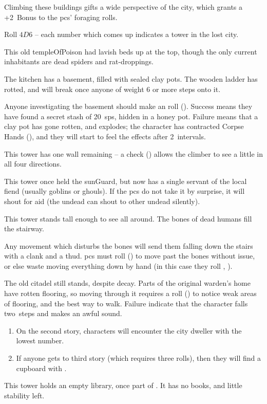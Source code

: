 \begin{multicols}{2}
Climbing these buildings gifts a wide perspective of the city, which grants a +2~Bonus to the \glspl{pc}' foraging rolls.

Roll $4D6$ -- each number which comes up indicates a tower in the lost city.

\begin{dlist}
  \item
  This old \gls{templeOfPoison} had lavish beds up at the top, though the only current inhabitants are dead spiders and rat-droppings.

  The kitchen has a basement, filled with sealed clay pots.
  The wooden ladder has rotted, and will break once anyone of \gls{weight} 6 or more steps onto it.

  Anyone investigating the basement should make an  roll (\tn[10]).
  Success means they have found a secret stash of 20~\glspl{sp}, hidden in a honey pot.
  Failure means that a clay pot has gone rotten, and explodes; the character has contracted Corpse Hands (), and they will start to feel the effects after 2~\glspl{interval}.
  \item
  This tower has one wall remaining -- a  check (\tn[8]) allows the climber to see a little in all four directions.
  \item
  This tower once held the \gls{sunGuard}, but now has a single servant of the local fiend (usually goblins or ghouls).
  If the \glspl{pc} do not take it by surprise, it will shout for aid (the undead can shout to other undead silently).
  \item
  This tower stands tall enough to see all around.
  The bones of dead humans fill the stairway.

  Any movement which disturbs the bones will send them falling down the stairs with a clank and a thud.
  \Glspl{pc} must roll  (\tn[11]) to move past the bones without issue, or else waste  moving everything down by hand (in this case they roll , \tn[7]).
  \item
  The old citadel still stands, despite decay.
  Parts of the original \gls{warden}'s home have rotten flooring, so moving through it requires a  roll (\tn[8]) to notice weak areas of flooring, and the best way to walk.
  Failure indicate that the character falls two~\glspl{step}%
  and makes an awful sound.
  \begin{enumerate}
    \item
    On the second story, characters will encounter the city dweller with the lowest number.
    \item
    If anyone gets to third story (which requires three rolls), then they will find a cupboard with \lootBig.
  \end{enumerate}
  \item
  This tower holds an empty library, once part of .
  It has no books, and little stability left.


\end{dlist}
\end{multicols}
